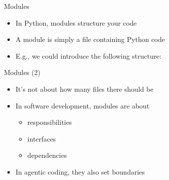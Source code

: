 \documentclass[
ps,
]{prosper}
\begin{document}
\begin{slide}{Modules}

\begin{itemize}

\item In Python, modules structure your code

\item A module is simply a file containing Python code

\item E.g., we could introduce the following structure:
  
\end{itemize}

\vspace*{-.3cm}
\begin{scriptsize}
\end{scriptsize}

\end{slide}




\begin{slide}{Modules (2)}

\begin{itemize}

\item It's not about how many files there should be
  
\item In software development, modules are about

  \begin{itemize}

  \item responsibilities

  \item interfaces

  \item dependencies
    
  \end{itemize}

\item In agentic coding, they also set boundaries
  
\end{itemize}
  
\end{slide}
\end{document}
